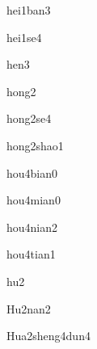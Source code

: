 \begin{multicols}{2}
\begin{verbete}[黑板]{hei1ban3}
\end{verbete}

\begin{verbete}[黑色]{hei1se4}
\end{verbete}

\begin{verbete}[很]{hen3}
\end{verbete}

\begin{verbete}[红]{hong2}
\end{verbete}

\begin{verbete}[红色]{hong2se4}
\end{verbete}

\begin{verbete}[红烧]{hong2shao1}
\end{verbete}

\begin{verbete}[后边]{hou4bian0}
\end{verbete}

\begin{verbete}[后面]{hou4mian0}
\end{verbete}

\begin{verbete}[后年]{hou4nian2}
\end{verbete}

\begin{verbete}[后天]{hou4tian1}
\end{verbete}

\begin{verbete}[湖]{hu2}
\end{verbete}

\begin{verbete}[湖南]{Hu2nan2}
\end{verbete}

\begin{verbete}[华盛顿]{Hua2sheng4dun4}
\end{verbete}


\end{multicols}
